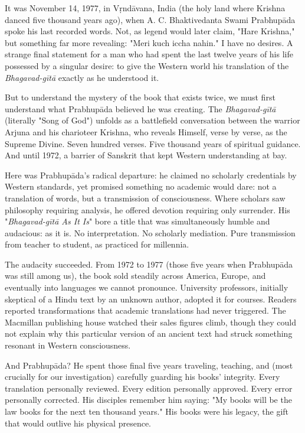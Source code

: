 \documentclass[12pt,twoside]{book}
\begin{document}
It was November 14, 1977, in Vṛndāvana, India (the holy land where Krishna danced five thousand years ago), when A. C. Bhaktivedanta Swami Prabhupāda spoke his last recorded words. Not, as legend would later claim, "Hare Krishna," but something far more revealing: "Meri kuch iccha nahin." I have no desires. A strange final statement for a man who had spent the last twelve years of his life possessed by a singular desire: to give the Western world his translation of the \emph{Bhagavad-gītā} exactly as he understood it.

But to understand the mystery of the book that exists twice, we must first understand what Prabhupāda believed he was creating. The \emph{Bhagavad-gītā} (literally "Song of God") unfolds as a battlefield conversation between the warrior Arjuna and his charioteer Krishna, who reveals Himself, verse by verse, as the Supreme Divine. Seven hundred verses. Five thousand years of spiritual guidance. And until 1972, a barrier of Sanskrit that kept Western understanding at bay.

Here was Prabhupāda's radical departure: he claimed no scholarly credentials by Western standards, yet promised something no academic would dare: not a translation of words, but a transmission of consciousness. Where scholars saw philosophy requiring analysis, he offered devotion requiring only surrender. His "\emph{Bhagavad-gītā As It Is}" bore a title that was simultaneously humble and audacious: as it is. No interpretation. No scholarly mediation. Pure transmission from teacher to student, as practiced for millennia.

The audacity succeeded. From 1972 to 1977 (those five years when Prabhupāda was still among us), the book sold steadily across America, Europe, and eventually into languages we cannot pronounce. University professors, initially skeptical of a Hindu text by an unknown author, adopted it for courses. Readers reported transformations that academic translations had never triggered. The Macmillan publishing house watched their sales figures climb, though they could not explain why this particular version of an ancient text had struck something resonant in Western consciousness.

And Prabhupāda? He spent those final five years traveling, teaching, and (most crucially for our investigation) carefully guarding his books' integrity. Every translation personally reviewed. Every edition personally approved. Every error personally corrected. His disciples remember him saying: "My books will be the law books for the next ten thousand years." His books were his legacy, the gift that would outlive his physical presence.
\end{document}

